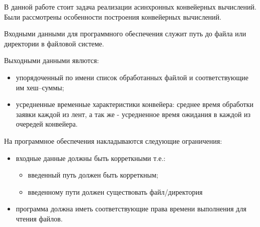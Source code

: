В данной работе стоит задача реализации асинхронных конвейерных вычислений. Были рассмотрены особенности построения конвейерных вычислений.
\clearpage

Входными данными для программного обеспечения служит путь до файла или директории в файловой системе.

Выходными данными явлются:
\begin{itemize}
    \item упорядоченный по имени список обработанных файлой и соответствующие им хеш--суммы;
    \item усредненные временные характеристики конвейера: среднее время обработки заявки каждой из лент, а так же - усредненное время ожидания в каждой из очередей конвейера.
\end{itemize}

На программное обеспечения накладываются следующие ограничения:
\begin{itemize}
    \item входные данные должны быть корреткными т.е.:
    \begin{itemize}
        \item введенный путь должен быть корреткным;
        \item введенному пути должен существовать файл/директория
    \end{itemize}
    \item программа должна иметь соответствующие права времени выполнения для чтения файлов.
\end{itemize}